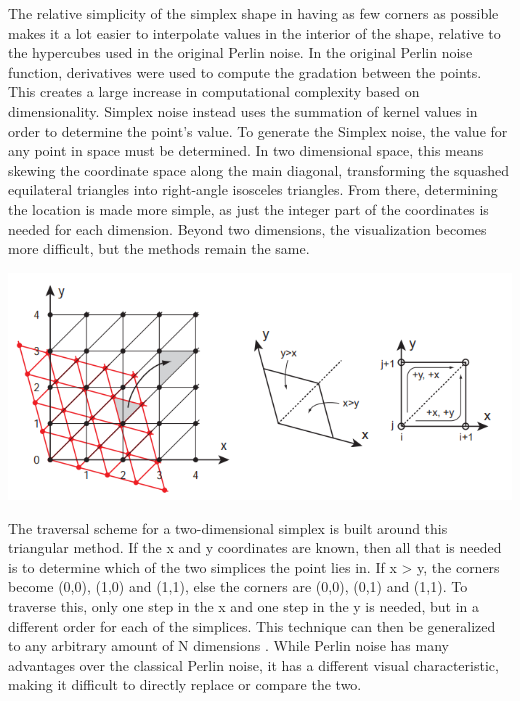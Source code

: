 \documentclass[10pt]{report}
\begin{document}
		The relative simplicity of the simplex shape in having as few corners as possible makes it a lot easier to interpolate values in the interior of the shape, relative to the hypercubes used in the original Perlin noise.
		In the original Perlin noise function, derivatives were used to compute the gradation between the points. This creates a large increase in computational complexity based on dimensionality. Simplex noise instead uses the summation of kernel values in order to determine the point's value. To generate the Simplex noise, the value for any point in space must be determined. In two dimensional space, this means skewing the coordinate space along the main diagonal, transforming the squashed equilateral triangles into right-angle isosceles triangles. From there, determining the location is made more simple, as just the integer part of the coordinates is needed for each dimension. Beyond two dimensions, the visualization becomes more difficult, but the methods remain the same.  
		
		\begin{minipage}{\textwidth}
			\centering
			\includegraphics[scale=.5]{skewed grid}
			\label{fig:fig9}
		\end{minipage}
		
		The traversal scheme for a two-dimensional simplex is built around this triangular method. If the x and y coordinates are known, then all that is needed is to determine which of the two simplices the point lies in. If x > y, the corners become (0,0), (1,0) and (1,1), else the corners are (0,0), (0,1) and (1,1). To traverse this, only one step in the x and one step in the y is needed, but in a different order for each of the simplices. This technique can then be generalized to any arbitrary amount of N dimensions \cite{simplex-demyst}. While Perlin noise has many advantages over the classical Perlin noise, it has a different visual characteristic, making it difficult to directly replace or compare the two. 
		
\end{document}
